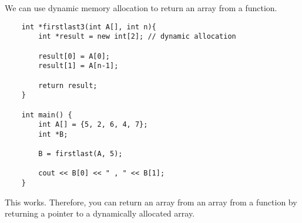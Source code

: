 \documentclass[]{article}
\begin{document}
We can use dynamic memory allocation to return an array from a function.

\begin{lstlisting}
	int *firstlast3(int A[], int n){
		int *result = new int[2]; // dynamic allocation
		
		result[0] = A[0];
		result[1] = A[n-1];
		
		return result;
	}
	
	int main() {
		int A[] = {5, 2, 6, 4, 7};
		int *B;
		
		B = firstlast(A, 5);
		
		cout << B[0] << " , " << B[1];
	}
\end{lstlisting}\bigbreak

This works. Therefore, you can return an array from an array from a function by returning a pointer to a dynamically allocated array. 
\end{document}
